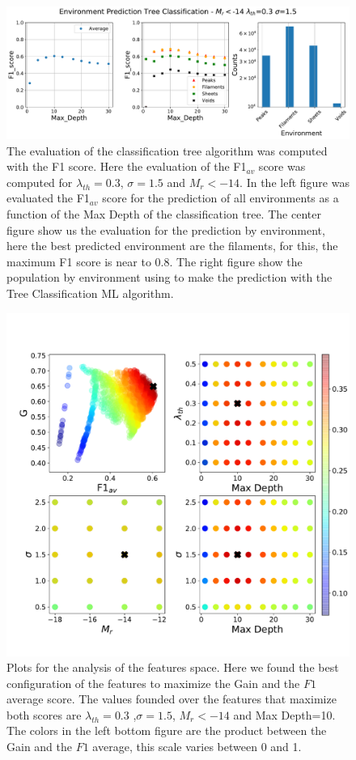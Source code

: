 \documentclass[usenatbib]{mnras}
\begin{document}
\begin{figure}
    \includegraphics[scale=0.45]{Figs/p_F1_EnvPredTreeClass.pdf}
    \caption{The evaluation of the classification tree algorithm was computed with the F1 score. Here the evaluation of the F1$_{av}$ score was computed for $\lambda_{th}=0.3$, $\sigma=1.5$ and $M_r<-14$.  In the left figure was evaluated the F1$_{av}$ score for the prediction of all environments as a function of the Max Depth of the classification tree. The center figure show us the evaluation for the prediction by environment, here the best predicted environment are the filaments, for this, the maximum F1 score is near to 0.8. The right figure show the population by environment using to make the prediction with the Tree Classification ML algorithm.}
    \label{fig:F1_curve}
\end{figure}


\begin{figure}
\centering
    \includegraphics[scale=0.5]{Figs/p_FS_Tree.pdf}
    \caption{Plots for the analysis of the features space. Here we found the best configuration of the features to maximize the Gain and the $F1$ average score. The values founded over the features that maximize both scores are $\lambda_{th}=0.3$ ,$\sigma=1.5$, $M_{r}<-14$ and Max Depth=10. The colors in the left bottom figure are the product between the Gain and the $F1$ average, this scale varies between 0 and 1.}
    \label{fig:features_space}
\end{figure}
\end{document}
